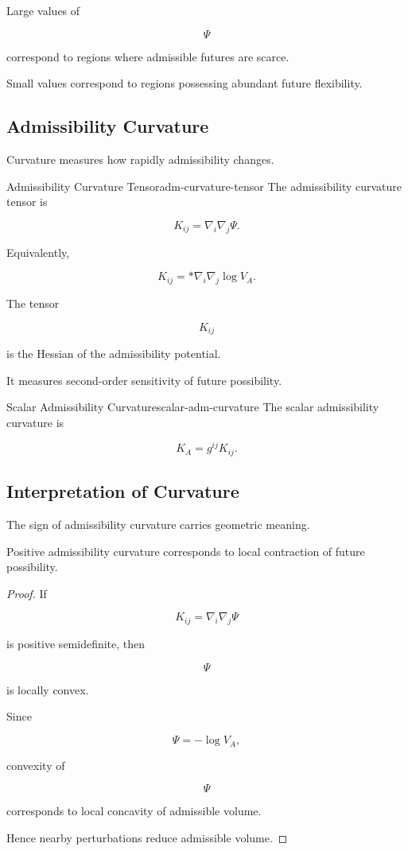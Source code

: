\documentclass[12pt,twoside,openright]{book}
\newenvironment{prop}
{\begin{proposition}{}{}}
{\end{proposition}}
\begin{document}
Large values of

\[
\Psi
\]

correspond to regions where admissible futures are scarce.

Small values correspond to regions possessing abundant
future flexibility.

\subsection{Admissibility Curvature}

Curvature measures how rapidly admissibility changes.

\begin{definition}{Admissibility Curvature Tensor}{adm-curvature-tensor}
The admissibility curvature tensor is

\[
K_{ij}
=

\nabla_i\nabla_j\Psi.
\]
\end{definition}

Equivalently,

\[
K_{ij}
=

*

\nabla_i\nabla_j
\log V_A.
\]

The tensor

\[
K_{ij}
\]

is the Hessian of the admissibility potential.

It measures second-order sensitivity of future
possibility.

\begin{definition}{Scalar Admissibility Curvature}{scalar-adm-curvature}
The scalar admissibility curvature is

\[
K_A
=

g^{ij}K_{ij}.
\]
\end{definition}

\subsection{Interpretation of Curvature}

The sign of admissibility curvature carries geometric
meaning.

\begin{prop}
Positive admissibility curvature corresponds to local
contraction of future possibility.
\end{prop}

\begin{proof}
If

\[
K_{ij}
=

\nabla_i\nabla_j\Psi
\]

is positive semidefinite, then

\[
\Psi
\]

is locally convex.

Since

\[
\Psi
=

-\log V_A,
\]

convexity of

\[
\Psi
\]

corresponds to local concavity of admissible volume.

Hence nearby perturbations reduce admissible volume.
\end{proof}
\end{document}
